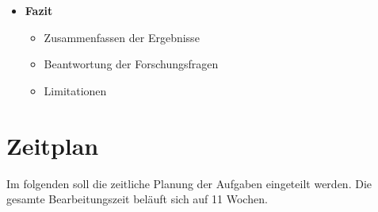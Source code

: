 \documentclass[
  ngerman,
  symmetric,
  cdfont=on,
  numbers=noenddot,
  parskip
]{tudscrreprt}
\begin{document}
\begin{itemize}[label=\textbullet, nosep]
  \item \textbf{Fazit}
    \begin{itemize}[label=--]
      \item Zusammenfassen der Ergebnisse 
      \item Beantwortung der Forschungsfragen
      \item Limitationen
    \end{itemize}
\end{itemize}


\section{Zeitplan}
Im folgenden soll die zeitliche Planung der Aufgaben eingeteilt werden. Die gesamte Bearbeitungszeit beläuft sich auf 11 Wochen. 
\end{document}
